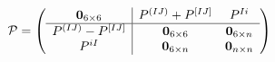 \begin{equation}
\mathcal{P}=\left(\begin{array}{c|c c}{\bf 0}_{6 \times 6} &
P^{(IJ)}+P^{[IJ]}& P^{Ii}\cr\hline P^{(IJ)}-P^{[IJ]}& {\bf 0}_{6
\times 6}& {\bf 0}_{6 \times n}\cr P^{iI} &{\bf 0}_{6 \times
n}&{\bf 0}_{n \times n}\end{array}\right)
\end{equation}

